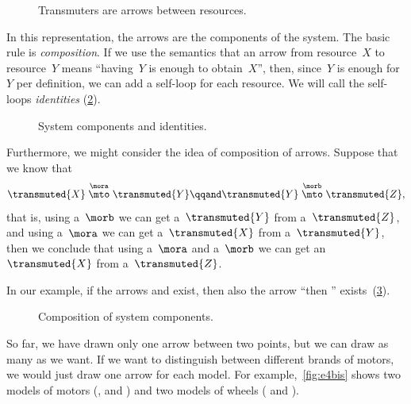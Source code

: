 
\begin{figure}[h!]
    \centering
    \caption{Transmuters are arrows between resources.}
    \label{fig:e2}
\end{figure}

In this representation, the arrows are the components of the system.
The basic rule is \emph{composition}.
If we use the semantics that an arrow from resource~$X$ to resource~$Y$ means ``having~$Y$ is enough to obtain~$X$'', then, since~$Y$ is enough for~$Y$ per definition, we can add a self-loop for each resource.
We will call the self-loops \emph{identities} (\cref{fig:e3}).

\begin{figure}[h!]
    \centering
    \caption{System components and identities. }
    \label{fig:e3}
\end{figure}

Furthermore, we might consider the idea of composition of arrows.
Suppose that we know that
%
\begin{equation}
    \transmuted{X} \stackrel{\mora}{\mto} \transmuted{Y}
    \qqand
    \transmuted{Y} \stackrel{\morb}{\mto} \transmuted{Z},
\end{equation}
%
that is, using a~$\morb$ we can get a~$\transmuted{Y}$ from a~$\transmuted{Z}$, and using a~$\mora$ we can get a~$\transmuted{X}$ from a~$\transmuted{Y}$, then we conclude that using a~$\mora$ and a~$\morb$ we can get an~$\transmuted{X}$ from a~$\transmuted{Z}$.

In our example, if the arrows \wheels and \motor exist, then also the arrow ``\wheels then \motor'' exists~(\cref{fig:e4}).

\begin{figure}[h!]
    \centering
    \caption{Composition of system components. }
    \label{fig:e4}
\end{figure}

So far, we have drawn only one arrow between two points, but we can draw as many as we want.
If we want to distinguish between different brands of motors, we would just draw one arrow for each model.
For example,~\cref{fig:e4bis} shows two models of motors (, and ) and two models of wheels ( and ).

